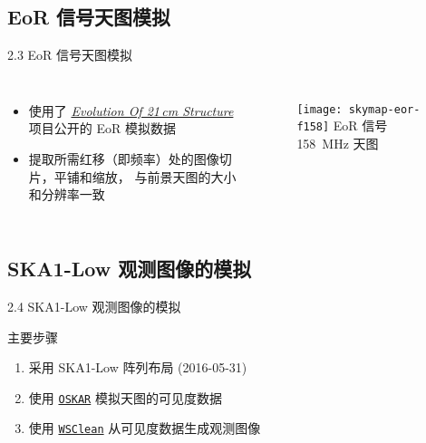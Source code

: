 \documentclass{beamer}
\begin{document}
\subsection{EoR 信号天图模拟}

\begin{frame}{2.3 EoR 信号天图模拟}
  \begin{columns}[t,onlytextwidth]
    \begin{itemize}
      \item 使用了 \href{http://homepage.sns.it/mesinger/EOS.html}{\textit{Evolution Of 21\,cm Structure}}
        项目公开的 EoR 模拟数据
      \item 提取所需红移（即频率）处的图像切片，平铺和缩放，
        与前景天图的大小和分辨率一致
    \end{itemize}

    \begin{figure}
      \centering\footnotesize
      \texttt{[image: skymap-eor-f158]}
      EoR 信号 \SI{158}{\MHz} 天图
    \end{figure}
  \end{columns}
\end{frame}

\subsection{SKA1-Low 观测图像的模拟}

\begin{frame}{2.4 SKA1-Low 观测图像的模拟}
  \begin{alertblock}{主要步骤}
  \begin{enumerate}
    \item 采用 \alert{SKA1-Low 阵列布局} (2016-05-31)
    \item 使用 \href{https://github.com/OxfordSKA/OSKAR}{\texttt{OSKAR}}
      模拟天图的\alert{可见度数据}
    \item 使用 \href{https://sourceforge.net/projects/wsclean/}{\texttt{WSClean}}
      从可见度数据生成\alert{观测图像}
  \end{enumerate}
  \end{alertblock}
\end{frame}


\end{document}

